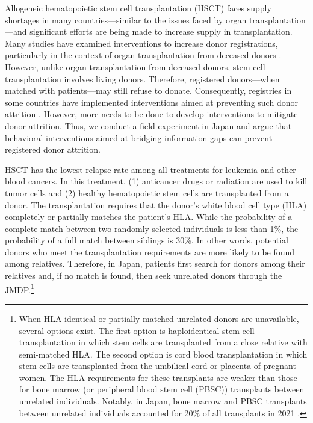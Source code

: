 \documentclass[12pt, a4paper]{article}
\begin{document}
Allogeneic hematopoietic stem cell transplantation (HSCT) faces supply shortages in many countries---similar to the issues faced by organ transplantation---and significant efforts are being made to increase supply in transplantation. Many studies have examined interventions to increase donor registrations, particularly in the context of organ transplantation from deceased donors \citep[for example,][]{Kessler2012}. However, unlike organ transplantation from deceased donors, stem cell transplantation involves living donors. Therefore, registered donors---when matched with patients---may still refuse to donate. Consequently, registries in some countries have implemented interventions aimed at preventing such donor attrition \citep{Switzer2018, Haylock2024}. However, more needs to be done to develop interventions to mitigate donor attrition. Thus, we conduct a field experiment in Japan and argue that behavioral interventions aimed at bridging information gaps can prevent registered donor attrition.

HSCT has the lowest relapse rate among all treatments for leukemia and other blood cancers. In this treatment, (1) anticancer drugs or radiation are used to kill tumor cells and (2) healthy hematopoietic stem cells are transplanted from a donor. The transplantation requires that the donor's white blood cell type (HLA) completely or partially matches the patient's HLA. While the probability of a complete match between two randomly selected individuals is less than 1\%, the probability of a full match between siblings is 30\%. In other words, potential donors who meet the transplantation requirements are more likely to be found among relatives. Therefore, in Japan, patients first search for donors among their relatives and, if no match is found, then seek unrelated donors through the JMDP.\footnote{When HLA-identical or partially matched unrelated donors are unavailable, several options exist. The first option is haploidentical stem cell transplantation in which stem cells are transplanted from a close relative with semi-matched HLA. The second option is cord blood transplantation in which stem cells are transplanted from the umbilical cord or placenta of pregnant women. The HLA requirements for these transplants are weaker than those for bone marrow (or peripheral blood stem cell (PBSC)) transplants between unrelated individuals. Notably, in Japan, bone marrow and PBSC transplants between unrelated individuals accounted for 20\% of all transplants in 2021 \citep{JapaneseDataCenterf2022}.}
\end{document}
